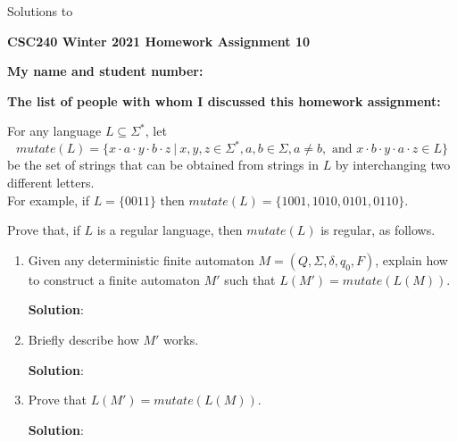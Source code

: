 \documentclass[11pt]{article}
\begin{document}
\begin{center}
Solutions to

{\bf \Large \bf CSC240 Winter 2021 Homework Assignment 10}\\
\end{center}


\noindent
{\bf My name and student number:}

\medskip

\noindent
{\bf The list of people with whom I discussed this homework assignment:}

\medskip

\noindent
\begin{question}
For any language $L \subseteq \Sigma^*$, let
$$mutate(L) = \{ x \cdot a \cdot y \cdot b \cdot z\ | \
x,y,z \in \Sigma^*, a,b \in \Sigma, a \neq b, \mbox{ and } x \cdot b \cdot y \cdot a \cdot z \in L\}$$
be the set of strings that can be obtained from strings in $L$ by interchanging two different letters.\\
For example, if $L = \{0011\}$ then $mutate(L) = \{1001,1010, 0101,0110\}$.

\noindent
Prove that, if $L$ is a regular language, then $mutate(L)$ is regular, as follows. 
\end{question}
\begin{enumerate}
\item
\begin{question}
Given any deterministic finite automaton $M=(Q,\Sigma,\delta, q_0,F)$, explain how to construct
a finite automaton $M'$ such that $L(M') = mutate(L(M))$.
\end{question}

\begin{solution}
{\bf Solution}:\\
\end{solution}

\item
\begin{question}
Briefly describe how $M'$ works.
\end{question}

\begin{solution}
{\bf Solution}:\\
\end{solution}

\item
\begin{question}
Prove that $L(M') = mutate(L(M))$.
\end{question}

\begin{solution}
{\bf Solution}:\\
\end{solution}

\end{enumerate}
\end{document}
